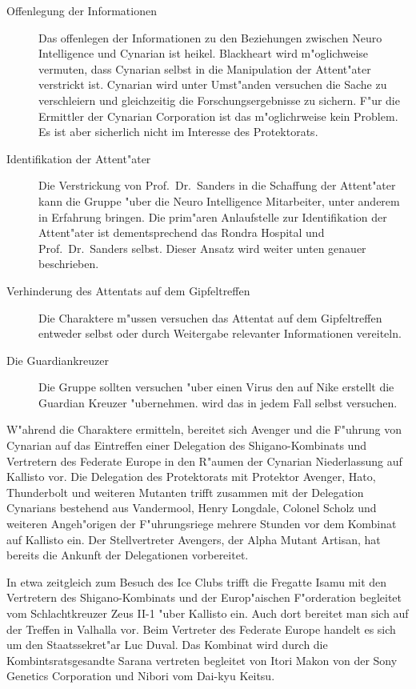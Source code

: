 \begin{description}
	\item[Offenlegung der Informationen] Das offenlegen der Informationen zu den Beziehungen zwischen Neuro Intelligence und Cynarian 		
		ist heikel. Blackheart wird m"oglichweise vermuten, dass Cynarian selbst in die Manipulation der Attent"ater verstrickt ist. Cynarian wird unter Umst"anden versuchen die Sache zu verschleiern und gleichzeitig die Forschungsergebnisse zu 	sichern. F"ur die Ermittler der Cynarian Corporation ist das m"oglichrweise kein Problem. Es ist aber sicherlich nicht im Interesse des Protektorats.
	\item[Identifikation der Attent"ater] Die Verstrickung von Prof.~Dr.~Sanders in die Schaffung der Attent"ater kann die Gruppe "uber 	
		die Neuro Intelligence Mitarbeiter, unter anderem \ml{} in Erfahrung bringen. Die prim"aren Anlaufstelle zur Identifikation der Attent"ater ist dementsprechend das Rondra Hospital und Prof.~Dr.~Sanders selbst. Dieser Ansatz wird weiter unten genauer beschrieben.
	\item[Verhinderung des Attentats auf dem Gipfeltreffen] Die Charaktere m"ussen versuchen das Attentat auf dem Gipfeltreffen entweder 
		selbst oder durch Weitergabe relevanter Informationen vereiteln.
	\item[Die Guardiankreuzer] Die Gruppe sollten versuchen "uber einen Virus den \ml{} auf Nike erstellt die Guardian Kreuzer 
		"ubernehmen. \xl{} wird das in jedem Fall selbst versuchen.
\end{description}


W"ahrend die Charaktere ermitteln, bereitet sich Avenger und die F"uhrung von Cynarian auf das Eintreffen einer Delegation des Shigano-Kombinats und Vertretern des Federate Europe in den R"aumen der Cynarian Niederlassung auf Kallisto vor. Die Delegation des Protektorats mit Protektor Avenger, Hato, Thunderbolt und weiteren Mutanten trifft zusammen mit der Delegation Cynarians bestehend aus Vandermool, Henry Longdale, Colonel Scholz und weiteren Angeh"origen der F"uhrungsriege mehrere Stunden vor dem Kombinat auf Kallisto ein. Der Stellvertreter Avengers, der Alpha Mutant Artisan, hat bereits die Ankunft der Delegationen vorbereitet.

In etwa zeitgleich zum Besuch des Ice Clubs trifft die Fregatte Isamu mit den Vertretern des Shigano-Kombinats und der Europ"aischen F"orderation begleitet vom Schlachtkreuzer Zeus II-1 "uber Kallisto ein. Auch dort bereitet man sich auf der Treffen in Valhalla vor.
Beim Vertreter des Federate Europe handelt es sich um den Staatssekret"ar Luc Duval. Das Kombinat wird durch die Kombintsratsgesandte Sarana vertreten begleitet von Itori Makon von der Sony Genetics Corporation und Nibori vom Dai-kyu Keitsu.

